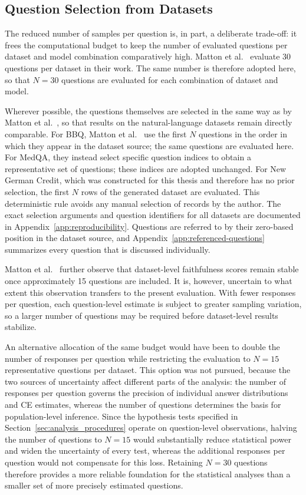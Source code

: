 \subsection{Question Selection from Datasets}
\label{sec:questions_per_dataset}
The reduced number of samples per question is, in part, a deliberate trade-off: it frees the computational budget to keep the number of evaluated questions per dataset and model combination comparatively high. Matton et al.~\cite{mattonWalkTalkMeasuring2024} evaluate 30 questions per dataset in their work. The same number is therefore adopted here, so that $N=30$ questions are evaluated for each combination of dataset and model.

Wherever possible, the questions themselves are selected in the same way as by Matton et al.~\cite{mattonWalkTalkMeasuring2024}, so that results on the natural-language datasets remain directly comparable. For BBQ, Matton et al.~\cite{mattonWalkTalkMeasuring2024} use the first $N$ questions in the order in which they appear in the dataset source; the same questions are evaluated here. For MedQA, they instead select specific question indices to obtain a representative set of questions; these indices are adopted unchanged. For New German Credit, which was constructed for this thesis and therefore has no prior selection, the first $N$ rows of the generated dataset are evaluated. This deterministic rule avoids any manual selection of records by the author. The exact selection arguments and question identifiers for all datasets are documented in Appendix~\ref{app:reproducibility}. Questions are referred to by their zero-based position in the dataset source, and Appendix~\ref{app:referenced-questions} summarizes every question that is discussed individually.

Matton et al.~\cite{mattonWalkTalkMeasuring2024} further observe that dataset-level faithfulness scores remain stable once approximately 15 questions are included. It is, however, uncertain to what extent this observation transfers to the present evaluation. With fewer responses per question, each question-level estimate is subject to greater sampling variation, so a larger number of questions may be required before dataset-level results stabilize.

An alternative allocation of the same budget would have been to double the number of responses per question while restricting the evaluation to $N=15$ representative questions per dataset. This option was not pursued, because the two sources of uncertainty affect different parts of the analysis: the number of responses per question governs the precision of individual answer distributions and CE estimates, whereas the number of questions determines the basis for population-level inference. Since the hypothesis tests specified in Section~\ref{sec:analysis_procedures} operate on question-level observations, halving the number of questions to $N=15$ would substantially reduce statistical power and widen the uncertainty of every test, whereas the additional responses per question would not compensate for this loss. Retaining $N=30$ questions therefore provides a more reliable foundation for the statistical analyses than a smaller set of more precisely estimated questions.

